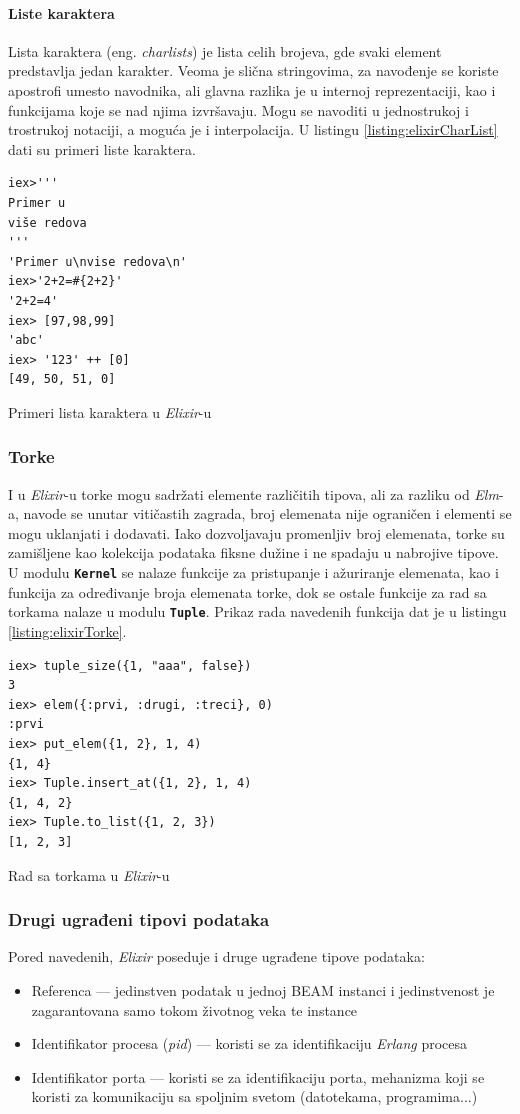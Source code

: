 \documentclass[12pt,oneside]{memoir}
\begin{document}
\paragraph{Liste karaktera }
Lista karaktera (eng. \emph{charlists}) je lista celih brojeva, gde svaki element predstavlja jedan karakter.
Veoma je slična stringovima, za navođenje se koriste apostrofi umesto navodnika, 
ali glavna razlika je u internoj reprezentaciji, kao i funkcijama koje se nad njima
izvršavaju. Mogu se navoditi u jednostrukoj i trostrukoj notaciji, a moguća je i 
interpolacija. U listingu \ref{listing:elixirCharList} dati su primeri liste karaktera.
\begin{listing}[h]
\begin{verbatim}
iex>'''
Primer u
više redova
'''
'Primer u\nvise redova\n'
iex>'2+2=#{2+2}'
'2+2=4'
iex> [97,98,99]
'abc'
iex> '123' ++ [0] 
[49, 50, 51, 0]
\end{verbatim}
\caption{Primeri lista karaktera u \emph{Elixir}-u}
\label{listing:elixirCharList}
\end{listing}

\subsubsection{Torke}
I u \emph{Elixir}-u torke mogu sadržati elemente različitih tipova, ali za razliku od \emph{Elm}-a,
navode se unutar vitičastih zagrada, broj elemenata nije ograničen i elementi se mogu uklanjati
i dodavati. Iako dozvoljavaju promenljiv broj elemenata, torke su zamišljene kao kolekcija
podataka fiksne dužine i ne spadaju u nabrojive tipove. U modulu \texttt{\textbf{Kernel}}
se nalaze funkcije za pristupanje i ažuriranje elemenata, kao i funkcija za određivanje broja
elemenata torke, dok se ostale funkcije za rad sa torkama nalaze u modulu \texttt{\textbf{Tuple}}.
Prikaz rada navedenih funkcija dat je u listingu \ref{listing:elixirTorke}.
\begin{listing}[!h]
\begin{verbatim}
iex> tuple_size({1, "aaa", false})
3
iex> elem({:prvi, :drugi, :treci}, 0)
:prvi
iex> put_elem({1, 2}, 1, 4)
{1, 4}
iex> Tuple.insert_at({1, 2}, 1, 4)
{1, 4, 2}
iex> Tuple.to_list({1, 2, 3})
[1, 2, 3]
\end{verbatim}
\caption{Rad sa torkama u \emph{Elixir}-u}
\label{listing:elixirTorke}
\end{listing}
\subsubsection{Drugi ugrađeni tipovi podataka}
Pored navedenih, \emph{Elixir} poseduje i druge ugrađene tipove podataka:
\begin{itemize}
  \item Referenca --- jedinstven podatak u jednoj BEAM instanci i jedinstvenost je
  zagarantovana samo tokom životnog veka te instance
  \item Identifikator procesa (\emph{pid}) --- koristi se za identifikaciju \emph{Erlang} procesa
  \item Identifikator porta --- koristi se za identifikaciju porta, mehanizma koji se
  koristi za komunikaciju sa spoljnim svetom (datotekama, programima...)
\end{itemize} 
\end{document}
